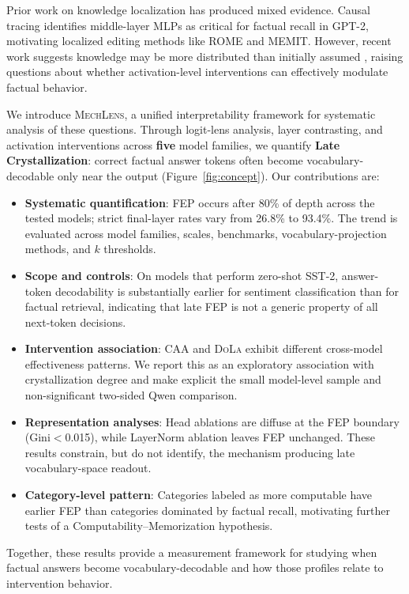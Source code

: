 \documentclass[11pt]{article}
\newcommand{\mechlens}{\textsc{MechLens}}
\newcommand{\dola}{\textsc{DoLa}}
\newcommand{\caa}{\textsc{CAA}}
\begin{document}
Prior work on knowledge localization has produced mixed evidence. Causal tracing \citep{meng2022locating} identifies middle-layer MLPs as critical for factual recall in GPT-2, motivating localized editing methods like ROME and MEMIT. However, recent work suggests knowledge may be more distributed than initially assumed \citep{geva2022transformer}, raising questions about whether activation-level interventions can effectively modulate factual behavior.

We introduce \mechlens{}, a unified interpretability framework for systematic analysis of these questions. Through logit-lens analysis, layer contrasting, and activation interventions across \textbf{five} model families, we quantify \textbf{Late Crystallization}: correct factual answer tokens often become vocabulary-decodable only near the output (Figure~\ref{fig:concept}). Our contributions are:

\begin{itemize}
    \item \textbf{Systematic quantification}: FEP occurs after 80\% of depth across the tested models; strict final-layer rates vary from 26.8\% to 93.4\%. The trend is evaluated across model families, scales, benchmarks, vocabulary-projection methods, and $k$ thresholds.
    \item \textbf{Scope and controls}: On models that perform zero-shot SST-2, answer-token decodability is substantially earlier for sentiment classification than for factual retrieval, indicating that late FEP is not a generic property of all next-token decisions.
    \item \textbf{Intervention association}: \caa{} and \dola{} exhibit different cross-model effectiveness patterns. We report this as an exploratory association with crystallization degree and make explicit the small model-level sample and non-significant two-sided Qwen comparison.
    \item \textbf{Representation analyses}: Head ablations are diffuse at the FEP boundary (Gini$<$0.015), while LayerNorm ablation leaves FEP unchanged. These results constrain, but do not identify, the mechanism producing late vocabulary-space readout.
    \item \textbf{Category-level pattern}: Categories labeled as more computable have earlier FEP than categories dominated by factual recall, motivating further tests of a Computability--Memorization hypothesis.
\end{itemize}

Together, these results provide a measurement framework for studying when factual answers become vocabulary-decodable and how those profiles relate to intervention behavior.
\end{document}
